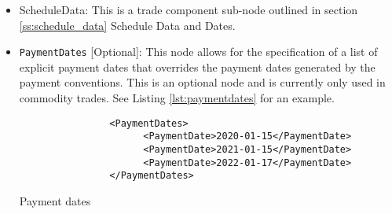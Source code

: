 \begin{itemize}
\item ScheduleData: This is a trade component sub-node outlined in section \ref{ss:schedule_data} Schedule Data and
Dates.
\item \lstinline!PaymentDates! [Optional]: This node allows for the specification of a list of explicit payment dates that overrides the payment dates generated by the payment conventions. This is an optional node and is currently only used in commodity trades.
See Listing \ref{lst:paymentdates} for an example. \break

\begin{listing}[H]
\begin{verbatim}
                <PaymentDates>
                      <PaymentDate>2020-01-15</PaymentDate>
                      <PaymentDate>2021-01-15</PaymentDate>
                      <PaymentDate>2022-01-17</PaymentDate>
                </PaymentDates>
\end{verbatim}
\caption{Payment dates}
\label{lst:paymentdates}
\end{listing}


\end{itemize}
